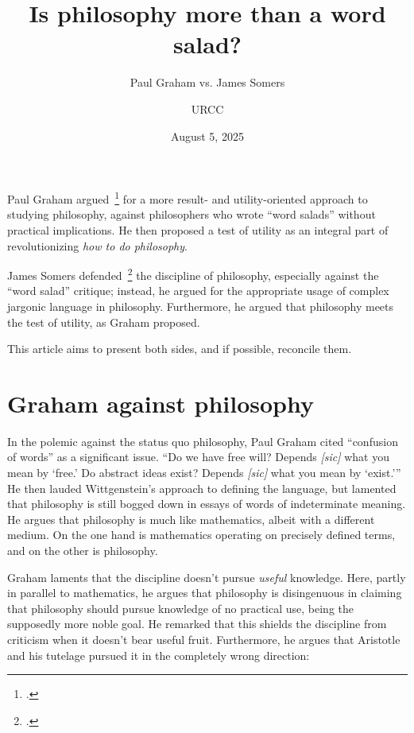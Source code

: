 \documentclass[12pt]{article}
\begin{document}
\title{Is philosophy more than a word salad?}
\subtitle{Paul Graham vs. James Somers}  %
\author{URCC}
\date{August 5, 2025}
\maketitle

\begin{preamble}
 Paul Graham argued~\footcite{grahamHowPhilosophy2007} for a more result- and utility-oriented approach to studying philosophy, against philosophers who wrote  ``word salads'' without practical implications. He then proposed a test of utility as an integral part of revolutionizing \emph{how to do philosophy}.

 James Somers defended~\footcite{somersDefensePhilosophyPauln.d.} the discipline of philosophy, especially against the \enquote{word salad} critique; instead, he argued for the appropriate usage of complex jargonic language in philosophy. Furthermore, he argued that philosophy meets the test of utility, as Graham proposed.

 This article aims to present both sides, and if possible, reconcile them.
\end{preamble}

\section{Graham against philosophy}

In the polemic against the status quo philosophy, Paul Graham cited \enquote{confusion of words} as a significant issue. \enquote{Do we have free will? Depends \emph{[sic]} what you mean by \enquote{free.} Do abstract ideas exist? Depends \emph{[sic]} what you mean by \enquote{exist.}} He then lauded Wittgenstein's approach to defining the language, but lamented that philosophy is still bogged down in essays of words of indeterminate meaning. He argues that philosophy is much like mathematics, albeit with a different medium. On the one hand is mathematics operating on precisely defined terms, and on the other is philosophy.

Graham laments that the discipline doesn't pursue \emph{useful} knowledge. Here, partly in parallel to mathematics, he argues that philosophy is disingenuous in claiming that philosophy should pursue knowledge of no practical use, being the supposedly more noble goal. He remarked that this shields the discipline from criticism when it doesn't bear useful fruit. Furthermore, he argues that Aristotle and his tutelage pursued it in the completely wrong direction:
\end{document}
